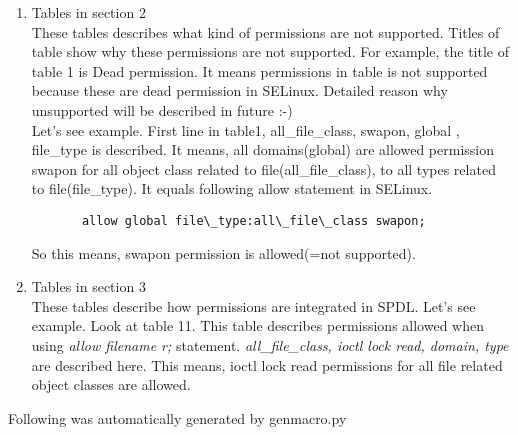 \documentclass{article}
\begin{document}
\begin{enumerate}
 \item Tables in section 2\\
       These tables describes what kind of permissions are not supported.
       Titles of table show why these permissions are not
       supported.
       For example, the title of table 1 is Dead permission. It means
       permissions in table is not supported because these are dead
       permission in SELinux.  Detailed reason why unsupported will be described in
       future :-)\\
       Let's see example. First line in table1, all\_file\_class,
       swapon, global , file\_type is described.
       It means, all domains(global) are allowed permission swapon for
       all object class related to file(all\_file\_class), to all types
       related to file(file\_type). It equals following allow statement
       in SELinux.
       \begin{verbatim}
       allow global file\_type:all\_file\_class swapon;	
       \end{verbatim}
       So this means, swapon permission is allowed(=not supported).
 \item Tables in section 3\\
       These tables describe how permissions are integrated in SPDL.
       Let's see example. Look at table 11. This table describes
       permissions allowed when using {\it allow filename r;} statement.       
{\it all\_file\_class, ioctl lock read, domain, type} are  described
       here.
       This means, ioctl lock read permissions for all file related
       object classes are allowed. 
\end{enumerate}


\newpage
Following  was automatically generated by genmacro.py

\end{document}
